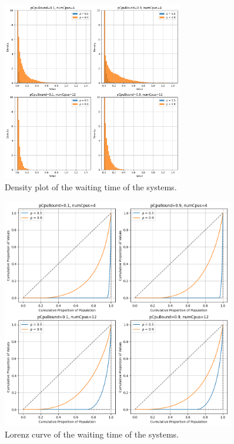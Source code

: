 \begin{figure}[H]
    \captionsetup{type=figure}
    \centering
    \includegraphics[width=0.7\textwidth]{./images/04/fcfs/wait/density.png}
    \caption{Density plot of the waiting time of the systems.}
    \label{fig:fcfsWaitDensity}
\end{figure}

\begin{figure}[H]
    \captionsetup{type=figure}
    \centering
    \includegraphics[width=0.9\textwidth]{./images/04/fcfs/wait/lorenz.png}
    \caption{Lorenz curve of the waiting time of the systems.}
    \label{fig:fcfsWaitLorenz}
\end{figure}


